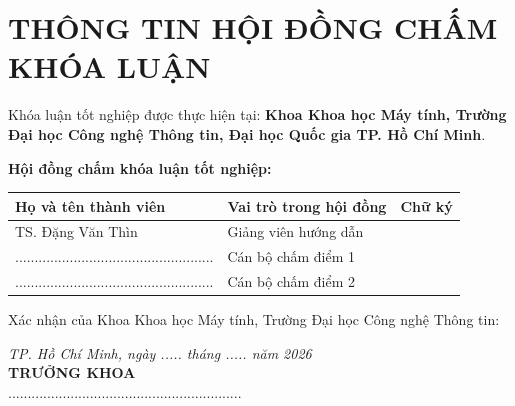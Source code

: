 \chapter*{THÔNG TIN HỘI ĐỒNG CHẤM KHÓA LUẬN}

Khóa luận tốt nghiệp được thực hiện tại: \textbf{Khoa Khoa học Máy tính, Trường Đại học Công nghệ Thông tin, Đại học Quốc gia TP. Hồ Chí Minh}.

\vspace{0.5cm}

\textbf{Hội đồng chấm khóa luận tốt nghiệp:}

\vspace{0.3cm}

\begin{table}[htbp]
    \centering
    \begin{tabular}{p{} p{} p{}}
        \toprule
        \textbf{Họ và tên thành viên} & \textbf{Vai trò trong hội đồng} & \textbf{Chữ ký} \\
        \midrule
        TS. Đặng Văn Thìn & Giảng viên hướng dẫn & \\
        ................................................... & Cán bộ chấm điểm 1 & \\
        ................................................... & Cán bộ chấm điểm 2 & \\
        \bottomrule
    \end{tabular}
\end{table}

\vspace{1cm}

Xác nhận của Khoa Khoa học Máy tính, Trường Đại học Công nghệ Thông tin:

\vspace{0.5cm}
\begin{flushright}
    \textit{TP. Hồ Chí Minh, ngày ..... tháng ..... năm 2026} \\
    \textbf{TRƯỞNG KHOA} \\
    \vspace{2cm}
    ............................................................
\end{flushright}
\newpage
